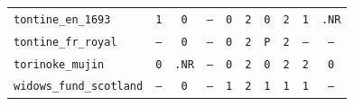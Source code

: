 \documentclass[11pt,a4paper]{article}
\begin{document}
\begin{table}[htbp]
\begin{tabular}{lccccccccc}
\texttt{tontine\_en\_1693} & \texttt{1} & \texttt{0} & \texttt{--} & \texttt{0} & \texttt{2} & \texttt{0} & \texttt{2} & \texttt{1} & \texttt{.NR} \\
\texttt{tontine\_fr\_royal} & \texttt{--} & \texttt{0} & \texttt{--} & \texttt{0} & \texttt{2} & \texttt{P} & \texttt{2} & \texttt{--} & \texttt{--} \\
\texttt{torinoke\_mujin} & \texttt{0} & \texttt{.NR} & \texttt{--} & \texttt{0} & \texttt{2} & \texttt{0} & \texttt{2} & \texttt{2} & \texttt{0} \\
\texttt{widows\_fund\_scotland} & \texttt{--} & \texttt{0} & \texttt{--} & \texttt{1} & \texttt{2} & \texttt{1} & \texttt{1} & \texttt{1} & \texttt{--} \\
\bottomrule\end{tabular}\end{table}
\end{document}

